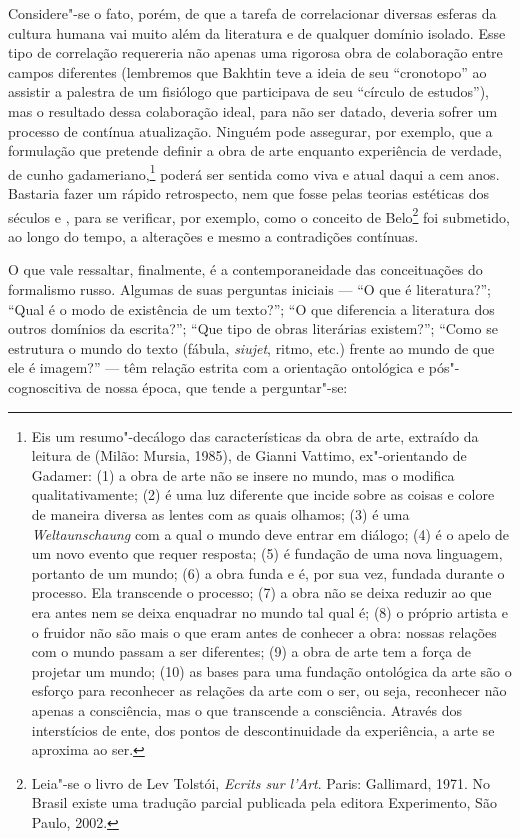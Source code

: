 {{{Considere"-se o fato, porém, de que a tarefa de correlacionar diversas
esferas da cultura humana vai muito além da literatura e de qualquer
domínio isolado. Esse tipo de correlação requereria não apenas uma
rigorosa obra de colaboração entre campos diferentes (lembremos que Bakhtin teve a ideia de seu ``cronotopo'' ao
assistir a palestra de um fisiólogo que participava de seu ``círculo de
estudos''), mas o resultado dessa colaboração ideal, para não ser
datado, deveria sofrer um processo de contínua atualização. Ninguém pode
assegurar, por exemplo, que a formulação que pretende definir a obra de
arte enquanto experiência de verdade, de cunho
gadameriano,\footnote{Eis 
um resumo"-decálogo das características da obra de arte, extraído da 
leitura de  (Milão: Mursia, 1985), de Gianni 
Vattimo, ex"-orientando de Gadamer: (1) a obra de arte não se insere 
no mundo, mas o modifica qualitativamente; (2) é uma luz diferente
 que incide sobre as coisas e colore de maneira diversa as lentes com 
as quais olhamos; (3) é uma \emph{Weltaunschaung} com a qual o mundo
 deve entrar em diálogo; (4) é o apelo de um novo evento que requer 
resposta; (5) é fundação de uma nova linguagem, portanto de um mundo; 
(6) a obra funda e é, por sua vez, fundada durante o processo. Ela
 transcende o processo; (7) a obra não se deixa reduzir ao que era 
antes nem se deixa enquadrar no mundo tal qual é;
(8) o próprio artista e o fruidor não são mais o que eram antes
 de conhecer a obra: nossas relações com o mundo passam a ser 
diferentes; (9) a obra de arte tem a força de projetar um mundo; (10)
 as bases para uma fundação ontológica da arte são o esforço para
 reconhecer as relações da arte com o ser, ou seja, reconhecer não 
apenas a consciência, mas o que transcende a consciência. Através dos 
interstícios de ente, dos pontos de descontinuidade da experiência, a 
arte se aproxima ao ser.} poderá ser sentida como viva e atual daqui 
a cem anos. Bastaria fazer um rápido retrospecto, nem que fosse pelas
 teorias estéticas dos séculos  e , para se 
verificar, por exemplo, como o conceito de Belo\footnote{Leia"-se o 
livro de Lev Tolstói, \emph{Ecrits sur l'Art}. Paris: Gallimard, 1971.
 No Brasil existe uma tradução parcial publicada pela editora 
Experimento, São Paulo, 2002.} foi submetido, ao longo do tempo, a 
alterações e mesmo a contradições contínuas.

O que vale ressaltar, finalmente, é a contemporaneidade das
conceituações do formalismo russo. Algumas de suas perguntas iniciais
--- ``O que é literatura?''; ``Qual é o modo de existência de um texto?'';
``O que diferencia a literatura dos outros domínios da escrita?''; ``Que
tipo de obras literárias existem?''; ``Como se estrutura o mundo do
texto (fábula, \emph{siujet}, ritmo, etc.) frente ao mundo de que ele é
imagem?'' --- têm relação estrita com a orientação ontológica e
pós"-cognoscitiva de nossa época, que tende a perguntar"-se:

}}}
